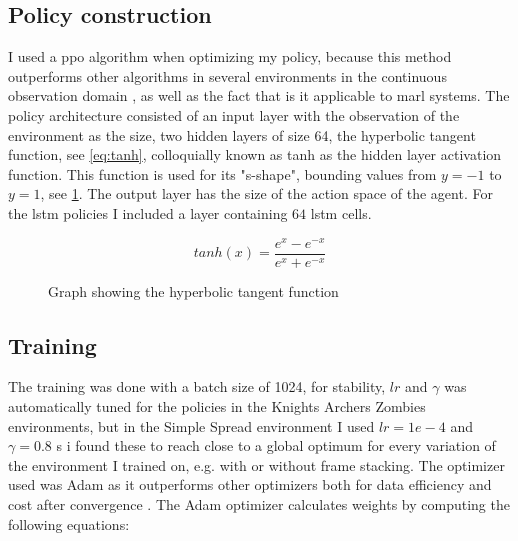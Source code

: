 \documentclass[UKenglish]{uiomasterthesis}
\begin{document}
\subsection{Policy construction}
I used a \ac{ppo} algorithm when optimizing my policy, because this method outperforms other algorithms in several environments in the continuous observation domain \cite{schulman2017proximalpolicyoptimizationalgorithms}, as well as the fact that is it applicable to \ac{marl} systems. The policy architecture consisted of an input layer with the observation of the environment as the size, two hidden layers of size 64, the hyperbolic tangent function, see \cref{eq:tanh}, colloquially known as tanh as the hidden layer activation function. This function is used for its "s-shape", bounding values from $y=-1$ to $y=1$, see \cref{fig:tanh}. The output layer has the size of the action space of the agent. For the \ac{lstm} policies I included a layer containing $64$ \ac{lstm} cells.

\begin{equation}
\label{eq:tanh}
tanh(x) = \frac{e^x-e^{-x}}{e^x+e^{-x}}
\end{equation}

\begin{figure}[H]
\centering
{}
\caption{Graph showing the hyperbolic tangent function}
\label{fig:tanh}
\end{figure}

\subsection{Training}
The training was done with a batch size of 1024, for stability, $lr$ and $\gamma$ was automatically tuned for the policies in the Knights Archers Zombies environments, but in the Simple Spread environment I used $lr = 1e-4$ and $\gamma = 0.8$ s i found these to reach close to a global optimum for every variation of the environment I trained on, e.g. with or without frame stacking. The optimizer used was Adam as it outperforms other optimizers both for data efficiency and cost after convergence \cite{adam_optim}. The Adam optimizer calculates weights by computing the following equations:
\end{document}
